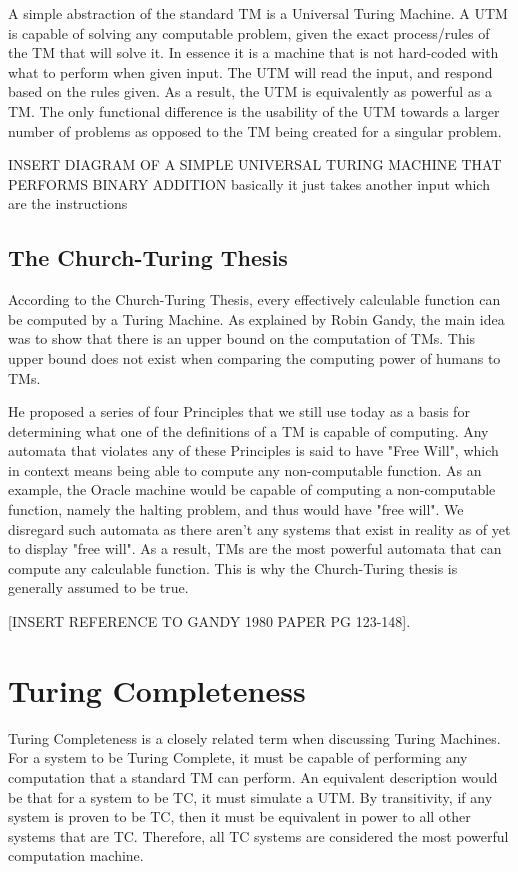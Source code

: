A simple abstraction of the standard TM is a Universal Turing Machine. A UTM is capable of solving any computable problem, given the exact process/rules of the TM that will solve it.
In essence it is a machine that is not hard-coded with what to perform when given input.
The UTM will read the input, and respond based on the rules given.
As a result, the UTM is equivalently as powerful as a TM.
The only functional difference is the usability of the UTM towards a larger number of problems as opposed to the TM being created for a singular problem.

INSERT DIAGRAM OF A SIMPLE UNIVERSAL TURING MACHINE THAT PERFORMS BINARY ADDITION
basically it just takes another input which are the instructions

\subsection{The Church-Turing Thesis}

According to the Church-Turing Thesis, every effectively calculable function can be computed by a Turing Machine.
As explained by Robin Gandy, the main idea was to show that there is an upper bound on the computation of TMs.
This upper bound does not exist when comparing the computing power of humans to TMs.

He proposed a series of four Principles that we still use today as a basis for determining what one of the definitions of a TM is capable of computing.
Any automata that violates any of these Principles is said to have "Free Will", which in context means being able to compute any non-computable function.
As an example, the Oracle machine would be capable of computing a non-computable function, namely the halting problem, and thus would have "free will".
We disregard such automata as there aren't any systems that exist in reality as of yet to display "free will".
As a result, TMs are the most powerful automata that can compute any calculable function.
This is why the Church-Turing thesis is generally assumed to be true.

[INSERT REFERENCE TO GANDY 1980 PAPER PG 123-148].

\section{Turing Completeness}

Turing Completeness is a closely related term when discussing Turing Machines.
For a system to be Turing Complete, it must be capable of performing any computation that a standard TM can perform.
An equivalent description would be that for a system to be TC, it must simulate a UTM.
By transitivity, if any system is proven to be TC, then it must be equivalent in power to all other systems that are TC.
Therefore, all TC systems are considered the most powerful computation machine.

